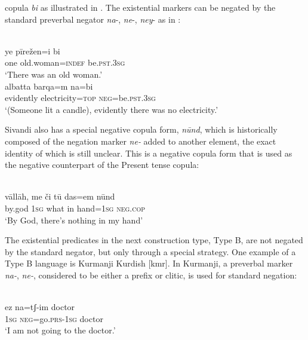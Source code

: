 ﻿\documentclass[output=paper]{langsci/langscibook}
\begin{document}
copula \textit{bi} as illustrated in . The existential
markers can be negated by the standard preverbal negator \textit{na}-,
\textit{ne}-, \textit{ney}- as in :
%
\begin{exe}\ex\label{ex:ieur-sivandi-woman}
\\
    \gll ye    pīrežen=i                 bi \\
one old.woman=\textsc{indef}   be.\textsc{pst.3sg} \\
    \glt `There was an old woman.'
\ex\label{ex:ieur-sivandi-electricity}
\\
    \gll albatta   barqa=m      na=bi \\
evidently   electricity=\textsc{top}   \textsc{neg}=be.\textsc{pst.3sg} \\
    \glt `(Someone lit a candle), evidently there was no electricity.'
    \end{exe}
%
Sivandi also has a special negative copula form, \textit{nūnd}, which is historically composed of the negation marker \textit{ne-} added to another element, the exact identity of which is still unclear. This is a negative copula form that is used as the negative counterpart of the Present tense copula:
%
\begin{exe}\ex\label{ex:ieur-sivandi-hand}
\\
    \gll vāllāh, me    či     tū das=em      nūnd \\
by.god  \textsc{1sg}  what in hand=\textsc{1sg}   \textsc{neg.cop} \\
    \glt `By God, there's nothing in my hand'
    \end{exe}
%
The existential predicates in the next construction type, Type B, are not
negated by the standard negator, but only through a special strategy. One
example of a Type B language is Kurmanji Kurdish [kmr]. In Kurmanji, a
preverbal marker \textit{na-}, \textit{ne-}, considered to be either a
prefix or clitic, is used for standard negation:
%
\begin{exe}\ex
{}\\  
    \gll ez      na=tʃ-im             doctor \\
\textsc{1sg}   \textsc{neg}=go.\textsc{prs}-\textsc{1sg}    doctor \\
    \glt `I am not going to the doctor.'
    \end{exe}
\end{document}
